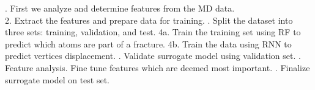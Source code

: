 \begin{itemize}
\begin{itemize}

. First we analyze and determine features from the MD data.
    \\
    2. Extract the features and prepare data for training. 
    . Split the dataset into three sets: training, validation, and test.
    \newline
    4a. Train the training set using RF to predict which atoms are part of a fracture.
    \newline
    4b. Train the data using RNN to predict vertices displacement.
    . Validate surrogate model using validation set. 
    . Feature analysis. Fine tune features which are deemed most important. 
    . Finalize surrogate model on test set. 




\end{itemize}


\end{itemize}